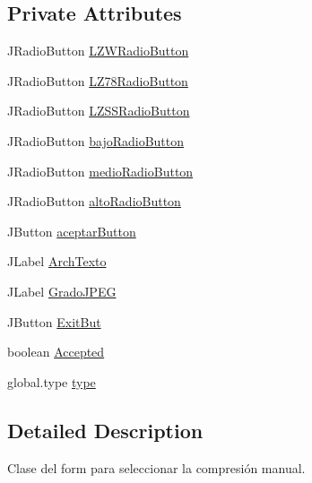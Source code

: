 \subsection*{Private Attributes}
\begin{DoxyCompactItemize}
\item 
J\+Radio\+Button \hyperlink{classpresentacion_1_1form_1_1PopUp__Comp_a810fe251f9c88e3b83ce466feafafe2e}{L\+Z\+W\+Radio\+Button}
\item 
J\+Radio\+Button \hyperlink{classpresentacion_1_1form_1_1PopUp__Comp_ac750ecbde516e2fee470693124d2ff63}{L\+Z78\+Radio\+Button}
\item 
J\+Radio\+Button \hyperlink{classpresentacion_1_1form_1_1PopUp__Comp_ad18c1029f04cc43d033183dca943977c}{L\+Z\+S\+S\+Radio\+Button}
\item 
J\+Radio\+Button \hyperlink{classpresentacion_1_1form_1_1PopUp__Comp_add9532658d448dcbfa9b7dd40ddc8b38}{bajo\+Radio\+Button}
\item 
J\+Radio\+Button \hyperlink{classpresentacion_1_1form_1_1PopUp__Comp_ad1daa09264648f37642b24a698e32206}{medio\+Radio\+Button}
\item 
J\+Radio\+Button \hyperlink{classpresentacion_1_1form_1_1PopUp__Comp_a9f49f4c6ce6d4f60a7015d8699aef151}{alto\+Radio\+Button}
\item 
J\+Button \hyperlink{classpresentacion_1_1form_1_1PopUp__Comp_a6321172d7f93f607a1cea6e2eee6a6ea}{aceptar\+Button}
\item 
J\+Label \hyperlink{classpresentacion_1_1form_1_1PopUp__Comp_a1b40d49127cf9752ea464d6660f04673}{Arch\+Texto}
\item 
J\+Label \hyperlink{classpresentacion_1_1form_1_1PopUp__Comp_acf726751a39641f547274bfe8176fedd}{Grado\+J\+P\+EG}
\item 
J\+Button \hyperlink{classpresentacion_1_1form_1_1PopUp__Comp_aad0de868daa06f82567784941064f12d}{Exit\+But}
\item 
boolean \hyperlink{classpresentacion_1_1form_1_1PopUp__Comp_af8e9310f7ff94d5a8cc917c66536bfde}{Accepted}
\item 
global.\+type \hyperlink{classpresentacion_1_1form_1_1PopUp__Comp_af1981117e5555e0308d7e4a0f61db50b}{type}
\end{DoxyCompactItemize}


\subsection{Detailed Description}
Clase del form para seleccionar la compresión manual. 

